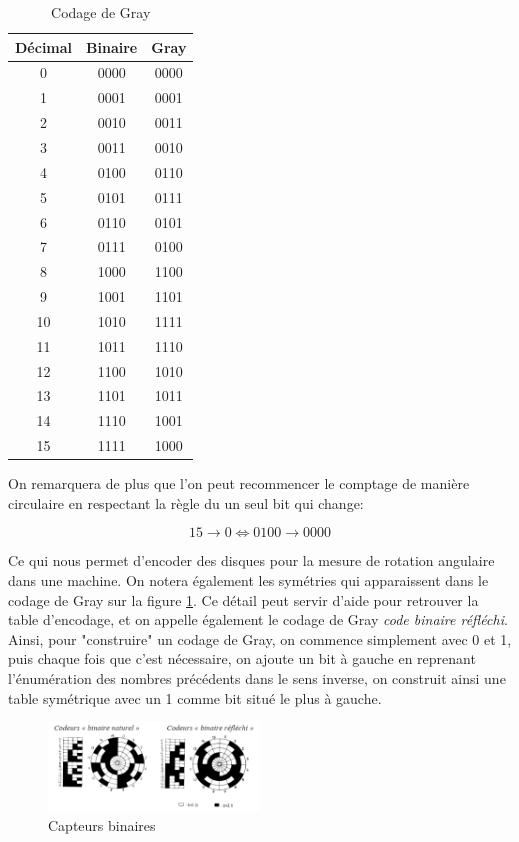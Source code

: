 \documentclass[a4paper,11pt]{book}
\theoremstyle{definition}
\begin{document}
\begin{table}[h!]
\centering
\begin{tabular}{ |c|c|c| } 
 \hline
 Décimal & Binaire & Gray  \\ 
 \hline
 0 & 0000 & 0000  \\ 
 1 & 0001 & 0001 \\ 
 2 & 0010 & 0011 \\ 
 3 & 0011 & 0010 \\ 
 4 & 0100 & 0110 \\ 
 5 & 0101 & 0111 \\ 
 6 & 0110 & 0101 \\ 
 7 & 0111 & 0100 \\ 
 8 & 1000 & 1100 \\ 
 9 & 1001 & 1101 \\ 
 10 & 1010 & 1111 \\ 
 11 & 1011 & 1110 \\ 
 12 & 1100 & 1010 \\ 
 13 & 1101 & 1011 \\ 
 14 & 1110 & 1001 \\ 
 15 & 1111 & 1000 \\ 
 \hline
\end{tabular}
\caption{Codage de Gray}
\label{table:1}
\end{table}

On remarquera de plus que l'on peut recommencer le comptage de manière circulaire en respectant la règle du un seul bit qui change: 

\[15 \rightarrow 0 \Leftrightarrow 0100 \rightarrow 0000\]

Ce qui nous permet d'encoder des disques pour la mesure de rotation angulaire dans une machine. On notera également les symétries qui apparaissent dans le codage de Gray sur la figure \ref{codeGray}. Ce détail peut servir d'aide pour retrouver la table d'encodage, et on appelle également le codage de Gray \textit{code binaire réfléchi}. Ainsi, pour "construire" un codage de Gray, on commence simplement avec 0 et 1, puis chaque fois que c'est nécessaire, on ajoute un bit à gauche en reprenant l'énumération des nombres précédents dans le sens inverse, on construit ainsi une table symétrique avec un 1 comme bit situé le plus à gauche.


\begin{figure}[h]
\centering
\includegraphics[width=0.5\textwidth]{media/comparaison_codes_binaires.png}
\caption{Capteurs binaires}
\label{codeGray}
\end{figure}
\end{document}
